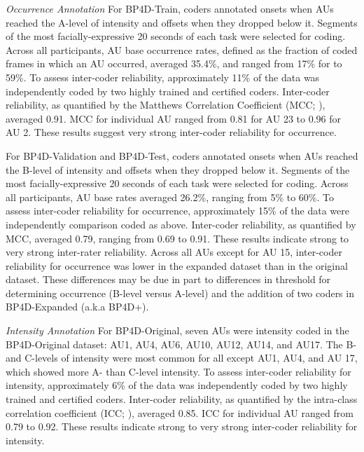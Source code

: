 \documentclass[a4paper, 10pt, conference]{ieeeconf}      \usepackage{FG2017}
\begin{document}
\emph{Occurrence Annotation}
\noindent For BP4D-Train, coders annotated onsets when AUs reached the A-level of intensity and offsets when they dropped below it. Segments of the most facially-expressive 20 seconds of each task were selected for coding. Across all participants, AU base occurrence rates, defined as the fraction of coded frames in which an AU occurred, averaged 35.4\%, and ranged from 17\% for to 59\%.
To assess inter-coder reliability, approximately 11\% of the data was independently coded by two highly trained and certified coders. Inter-coder reliability, as quantified by the Matthews Correlation Coefficient (MCC; \cite{Powers2011_EPR}), averaged 0.91. MCC for individual AU ranged from 0.81 for AU 23 to 0.96 for AU 2. These results suggest very strong inter-coder reliability for occurrence.  




For BP4D-Validation and BP4D-Test, coders annotated onsets when AUs reached the B-level of intensity and offsets when they dropped below it. Segments of the most facially-expressive 20 seconds of each task were selected for coding. Across all participants, AU base rates averaged 26.2\%, ranging from 5\% to 60\%.
To assess inter-coder reliability for occurrence, approximately 15\% of the data were independently comparison coded as above. Inter-coder reliability, as quantified by MCC, averaged 0.79, ranging from 0.69 to 0.91. These results indicate strong to very strong inter-rater reliability.
Across all AUs except for AU 15, inter-coder reliability for occurrence was lower in the expanded dataset than in the original dataset. These differences may be due in part to differences in threshold for determining occurrence (B-level versus A-level) and the addition of two coders in BP4D-Expanded (a.k.a BP4D+). 


\emph{Intensity Annotation}
For BP4D-Original, seven AUs were intensity coded in the BP4D-Original dataset: AU1, AU4, AU6, AU10, AU12, AU14, and AU17. The B- and C-levels of intensity were most common for all except AU1, AU4, and AU 17, which showed more A- than C-level intensity.
To assess inter-coder reliability for intensity, approximately 6\% of the data was independently coded by two highly trained and certified coders. Inter-coder reliability, as quantified by the intra-class correlation coefficient (ICC; \cite{ShroutFleiss1979_ICU}), averaged 0.85. ICC for individual AU ranged from 0.79 to 0.92. These results indicate strong to very strong inter-coder reliability for intensity.
\end{document}
